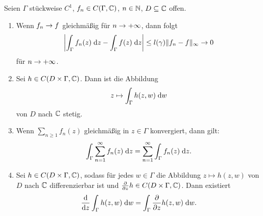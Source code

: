 \documentclass[a4paper,twoside,DIV15,BCOR12mm]{scrbook}
\begin{document}
\begin{satz}\label{satz2.7}
Seien $\Gamma$ stückweise $C^1$, $f_n\in C(\Gamma,\mathbb{C})$, $n\in\mathbb{N}$, $D\subseteq\mathbb{C}$ offen.
\begin{enumerate}
\item Wenn $f_n\rightarrow f$ gleichmäßig für $n\rightarrow+\infty$, dann folgt
\[\left\lvert\int_{\Gamma}^{}{f_n(z)}\;\mathrm{d} z-\int_{\Gamma}^{}{f(z)}\;\mathrm{d} z\right\lvert \leq l(\gamma) \|f_n-f\|_\infty\rightarrow 0\]
für $n\rightarrow+\infty$.

\item Sei $h\in C(D\times\Gamma,\mathbb{C})$. Dann ist die Abbildung
\[z\mapsto\int_{\Gamma}^{}{h(z,w)}\;\mathrm{d} w\]
von $D$ nach $\mathbb{C}$ stetig.

\item Wenn $\displaystyle\sum_{n\geq1}f_n(z)$ gleichmäßig in $z\in\Gamma$ konvergiert, dann gilt:
\[\int_{\Gamma}^{}{\sum_{n=1}^\infty f_n(z)}\;\mathrm{d} z = \sum_{n=1}^\infty\int_{\Gamma}^{}{f_n(z)}\;\mathrm{d} z.\]

\item Sei $h\in C(D\times\Gamma,\mathbb{C})$, sodass für jedes $w\in\Gamma$ die Abbildung $z\mapsto h(z,w)$ von $D$ nach $\mathbb{C}$ differenzierbar ist und $\frac{\partial}{\partial z}h\in C(D\times\Gamma,\mathbb{C})$. Dann existiert
\[\frac{\mathrm{d}}{\mathrm{d} z}\int_{\Gamma}^{}{h(z,w)}\;\mathrm{d} w = \int_{\Gamma}^{}{\frac{\partial}{\partial z}h(z,w)}\;\mathrm{d} w.\]
\end{enumerate}
\end{satz}
\end{document}
